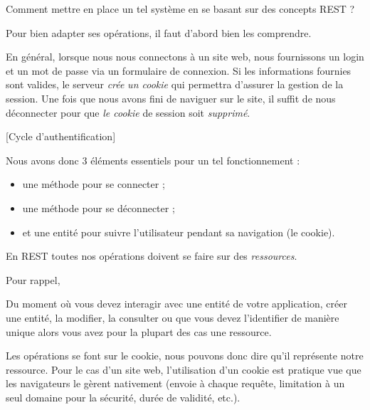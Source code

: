\documentclass[big]{zmdocument}
\begin{document}
\begin{Question}
Comment mettre en place un tel système en se basant sur des concepts REST ?
\end{Question}


Pour bien adapter ses opérations, il faut d'abord bien les comprendre.



En général, lorsque nous nous connectons à un site web, nous fournissons un login et un mot de passe via un formulaire de connexion. Si les informations fournies sont valides, le serveur \textit{crée} \textit{un cookie} qui permettra d'assurer la gestion de la session. Une fois que nous avons fini de naviguer sur le site, il suffit de nous déconnecter pour que \textit{le cookie} de session soit \textit{supprimé}.



[Cycle d'authentification]


Nous avons donc 3 éléments essentiels pour un tel fonctionnement :



\begin{itemize}
\item une méthode pour se connecter ;
\item une méthode pour se déconnecter ;
\item et une entité pour suivre l'utilisateur pendant sa navigation (le cookie).
\end{itemize}


En REST toutes nos opérations doivent se faire sur des \textit{ressources}.



Pour rappel,



\begin{Quotation}
Du moment où vous devez interagir avec une entité de votre application, créer une entité, la modifier, la consulter ou que vous devez l'identifier de manière unique alors vous avez pour la plupart des cas une ressource.
\end{Quotation}



Les opérations se font sur le cookie, nous pouvons donc dire qu'il représente notre ressource. Pour le cas d'un site web, l'utilisation d'un cookie est pratique vue que les navigateurs le gèrent nativement (envoie à chaque requête, limitation à un seul domaine pour la sécurité, durée de validité, etc.).
\end{document}
